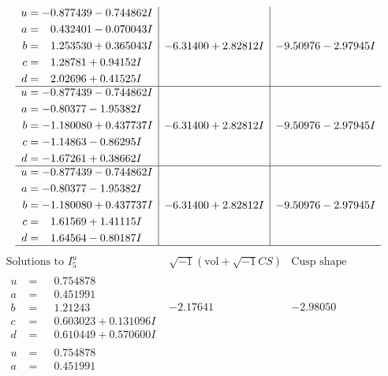 \documentclass[1p]{elsarticle_modified}
\theoremstyle{definition}
\newcommand{\I}{\sqrt{-1}}
\begin{document}
$$\begin{array}{c|c|c}
\begin{aligned}
u &= -0.877439 - 0.744862 I \\
a &= \phantom{-}0.432401 - 0.070043 I \\
b &= \phantom{-}1.253530 + 0.365043 I \\
c &= \phantom{-}1.28781 + 0.94152 I \\
d &= \phantom{-}2.02696 + 0.41525 I\end{aligned}
 & -6.31400 + 2.82812 I & -9.50976 - 2.97945 I \\ \hline\begin{aligned}
u &= -0.877439 - 0.744862 I \\
a &= -0.80377 - 1.95382 I \\
b &= -1.180080 + 0.437737 I \\
c &= -1.14863 - 0.86295 I \\
d &= -1.67261 + 0.38662 I\end{aligned}
 & -6.31400 + 2.82812 I & -9.50976 - 2.97945 I \\ \hline\begin{aligned}
u &= -0.877439 - 0.744862 I \\
a &= -0.80377 - 1.95382 I \\
b &= -1.180080 + 0.437737 I \\
c &= \phantom{-}1.61569 + 1.41115 I \\
d &= \phantom{-}1.64564 - 0.80187 I\end{aligned}
 & -6.31400 + 2.82812 I & -9.50976 - 2.97945 I\\
 \hline 
 \end{array}$$\newpage$$\begin{array}{c|c|c}  
\text{Solutions to }I^u_{5}& \I (\text{vol} + \sqrt{-1}CS) & \text{Cusp shape}\\
 \hline 
\begin{aligned}
u &= \phantom{-}0.754878\phantom{ +0.000000I} \\
a &= \phantom{-}0.451991\phantom{ +0.000000I} \\
b &= \phantom{-}1.21243\phantom{ +0.000000I} \\
c &= \phantom{-}0.603023 + 0.131096 I \\
d &= \phantom{-}0.610449 + 0.570600 I\end{aligned}
 & -2.17641\phantom{ +0.000000I} & -2.98050\phantom{ +0.000000I} \\ \hline\begin{aligned}
u &= \phantom{-}0.754878\phantom{ +0.000000I} \\
a &= \phantom{-}0.451991\phantom{ +0.000000I} \\

\end{aligned}
\end{array}$$
\end{document}
